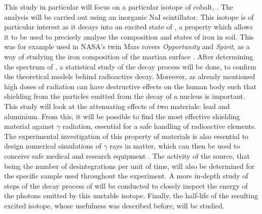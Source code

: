 This study in particular will focus on a particular isotope of cobalt, \cobalt.
The analysis will be carried out using an inorganic NaI scintillator.
This isotope is of particular interest as it decays into an excited state of \iron, a property which allows it to be used to precisely analyse the composition and states of iron in soil.
This was for example used in NASA's twin Mars rovers \emph{Opportunity} and \emph{Spirit}, as a way of studying the iron composition of the martian surface \cite{klingelhofer_mossbauer_2004} \cite{schroder_mossbauer_2015}.
After determining the spectrum of \cobalt, a statistical study of the decay process will be done, to confirm the theoretical models behind radioactive decay.
Moreover, as already mentioned high doses of radiation can have destructive effects on the human body
such that shielding from the particles emitted from the decay of a nucleus is important.
This study will look at the attenuating effects of two materials: lead and aluminium. From this, it will be possible to find the most effective shielding material against \(\gamma\) radiation, essential for a safe handling of radioactive elements.
The experimental investigation of this property of materials is also essential to design numerical simulations of $\gamma$ rays in matter, which can then be used to conceive safe medical and research equipment \cite{sukara_simulation_2017}.
The activity of the source, that being the number of desintegrations per unit of time, will also be determined for the specific \cobalt sample used throughout the experiment.
A more in-depth study of steps of the decay process of \cobalt will be conducted to closely inspect the energy of the photons emitted by this unstable isotope.
Finally, the half-life of the resulting excited \iron isotope, whose usefulness was described before, will be studied.
